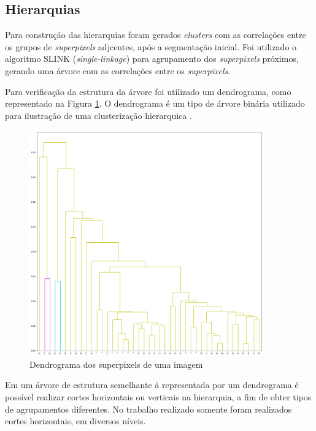 \begin{document}
\subsection{Hierarquias} \label{ssec:hierquia_segm}


Para construção das hierarquias foram gerados \textit{clusters} com as correlações entre os grupos de \textit{superpixels} adjcentes, após a segmentação inicial. Foi utilizado o algoritmo SLINK (\textit{single-linkage}) para agrupamento dos \textit{superpixels} próximos, gerando uma árvore com as correlações entre os \textit{superpixels}.

Para verificação da estrutura da árvore foi utilizado um dendrograma, como representado na Figura \ref{fig:DENDROGRAM}. O dendrograma é um tipo de árvore binária utilizado para ilustração de uma clusterização hierarquica \cite{SINGLE_LINKAGE}.

\begin{figure}[ht]
\centering
\includegraphics[width=0.9\textwidth]{dendrogram.png}
\caption{Dendrograma dos superpixels de uma imagem}
\label{fig:DENDROGRAM}
\end{figure}

Em um árvore de estrutura semelhante à representada por um dendrograma é possível realizar cortes horizontais ou verticais na hierarquia, a fim de obter tipos de agrupamentos diferentes. No trabalho realizado somente foram realizados cortes horizontais, em diversos níveis. 
\end{document}
